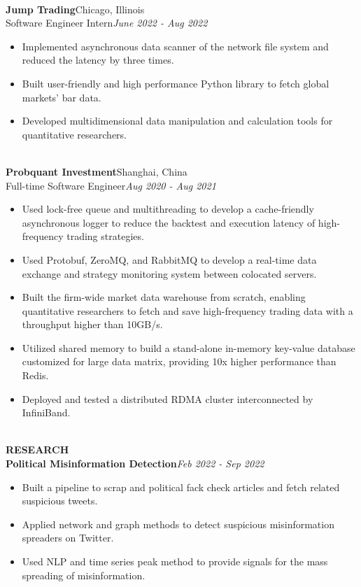 \documentclass[10pt,a4paper]{article}
\begin{document}
\noindent\\
\textbf{Jump Trading}\hfill Chicago, Illinois\\
Software Engineer Intern\hfill\emph{June 2022 - Aug 2022}
\begin{itemize}[noitemsep,topsep=0pt]
    \item Implemented asynchronous data scanner of the network file system and reduced the latency by three times.
    \item Built user-friendly and high performance Python library to fetch global markets' bar data. 
    \item Developed multidimensional data manipulation and calculation tools for quantitative researchers.
\end{itemize}
\noindent\\
\textbf{Probquant Investment}\hfill Shanghai, China\\
Full-time Software Engineer\hfill\emph{Aug 2020 - Aug 2021}
\begin{itemize}[noitemsep,topsep=0pt]
    \item Used lock-free queue and multithreading to develop a cache-friendly asynchronous logger to reduce the backtest and execution latency of high-frequency trading strategies.
    \item Used Protobuf, ZeroMQ, and RabbitMQ to develop a real-time data exchange and strategy monitoring system between colocated servers.
    \item Built the firm-wide market data warehouse from scratch, enabling quantitative researchers to fetch and save high-frequency trading data with a throughput higher than 10GB/s.
    \item Utilized shared memory to build a stand-alone in-memory key-value database customized for large data matrix, providing 10x higher performance than Redis.
    \item Deployed and tested a distributed RDMA cluster interconnected by InfiniBand.
\end{itemize}
\noindent\\
\rlap{\rule[-1mm]{\linewidth}{.5mm}}\textbf{\large{RESEARCH}}\\
\textbf{Political Misinformation Detection}\hfill \emph{Feb 2022 - Sep 2022}
\begin{itemize}[noitemsep,topsep=0pt]
\item Built a pipeline to scrap and political fack check articles and fetch related suspicious tweets.
\item Applied network and graph methods to detect suspicious misinformation spreaders on Twitter.
\item Used NLP and time series peak method to provide signals for the mass spreading of misinformation.\\
\end{itemize}
\end{document}
